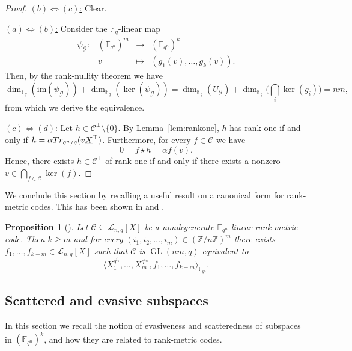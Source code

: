 \documentclass[11pt]{article}
\newtheorem{prop}[theo]{Proposition}
\theoremstyle{definition}
\numberwithin{equation}{section}
\DeclareMathOperator{\GL}{GL}
\begin{document}
\begin{proof}
\underline{$(b)\Longleftrightarrow (c)$:} Clear.

\underline{$(a)\Longleftrightarrow (b)$:} Consider the $\mathbb{F}_q$-linear map
$$\begin{array}{rccl}\psi_\mathcal{G}:&({\mathbb F}_{q^n})^m &\longrightarrow & ({\mathbb F}_{q^n})^k \\
&v & \longmapsto & (g_1(v),\ldots,g_k(v)).
\end{array}$$
Then, by the rank-nullity theorem we have 
$$ \dim_{\mathbb{F}_q}(\mathrm{im}(\psi_\mathcal{G}))+\dim_{\mathbb{F}_q}(\ker(\psi_{\mathcal{G}}))=\dim_{\mathbb{F}_q}(U_\mathcal{G})+\dim_{\mathbb{F}_q}\Big(\bigcap_i\ker(g_i)\Big)=nm,$$
from which we derive the equivalence.

 \underline{$(c)\Longleftrightarrow (d)$:}  Let $h\in \mathcal{C}^\perp\setminus\{0\}$. By Lemma~\ref{lem:rankone}, $h$ has rank one if and only if $h=\alpha {\rm Tr}_{q^n/q}(v \underline{X}^\top)$. Furthermore, 
 for every $f\in \mathcal{C}$ we have
 $$0=f\star h=\alpha f(v).$$
 Hence, there exists $h\in\mathcal{C}^\perp$ of rank one if and only if there exists a nonzero \mbox{$v\in\bigcap_{f\in\mathcal{C}} \ker(f)$}.
 \end{proof}

We conclude this section by recalling a useful result on a canonical form for rank-metric codes. This has been shown in \cite[Corollary IV.10]{polverino2023divisible} and \cite[Theorem 5.3]{alfarano2023critical}.
\begin{prop}[\cite{alfarano2023critical,polverino2010linear}]\label{prop:standard_form}
    Let $\mathcal{C}\subseteq \mathcal{L}_{n,q}[\underline{X}]$ be a nondegenerate ${\mathbb F}_{q^n}$-linear rank-metric code. Then $k\ge m$ and for every $(i_1, i_2,\ldots, i_m) \in (\mathbb{Z}/n\mathbb{Z})^m$ there exists $f_{1},\ldots, f_{k-m} \in \mathcal{L}_{n,q}[\underline{X}]$ such that $\mathcal{C}$ is $\GL(nm,q)$-equivalent to
    $$\langle X_1^{q^{i_1}},\ldots,X_m^{q^{i_m}},f_{1},\ldots,f_{k-m} \rangle_{{\mathbb F}_{q^n}}.$$
\end{prop}

\subsection{Scattered and evasive subspaces}

In this section we recall the notion of evasiveness and scatteredness of subspaces in $(\mathbb{F}_{q^n})^k$, and how they are related to rank-metric codes.
\end{document}
